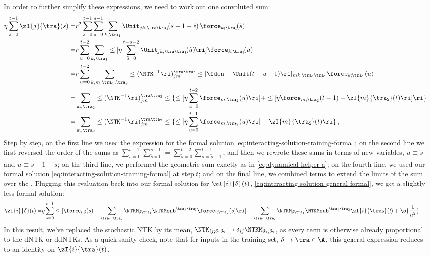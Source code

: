 In order to further simplify these expressions, we need to work out one convoluted sum:
\begin{align}
\eta\sum_{s=0}^{t-1}\zI{j}{\tra}(s)=&\eta^2\sum_{s=0}^{t-1}\sum_{\tilde{s}=0}^{s-1}\sum_{k,\tra_1} \Unit_{jk;\tra\tra_1}\!(s-1-\tilde{s})\,\force_{k;\tra_1}\!(\tilde{s})\, \\
=&\eta \sum_{u=0}^{t-2}\sum_{k,\tra_1} \le[\eta \sum_{\tilde{u}=0}^{t-u-2}\Unit_{jk;\tra\tra_1}\!(\tilde{u})\ri]\force_{k;\tra_1}\!(u)\, \notag\\
=&\eta\sum_{u=0}^{t-2}\sum_{k,m,\tra_1,\tra_2}\le(\NTK^{-1}\ri)_{jm}^{\tra\tra_2}\le[\Iden-\Unit(t-u-1)\ri]_{mk;\tra_2\tra_1}\force_{k;\tra_1}(u)\, \notag\\
=&\sum_{m,\tra_2}\le(\NTK^{-1}\ri)_{jm}^{\tra\tra_2}\le\{\le[\eta\sum_{u=0}^{t-2}\force_{m;\tra_2}(u)\ri]+ \le[ \eta\force_{m;\tra_2}(t-1) -\zI{m}{\tra_2}(t)\ri]   \ri\}\, \notag\\
=&\sum_{m,\tra_2}\le(\NTK^{-1}\ri)_{jm}^{\tra\tra_2}\le\{\le[\eta\sum_{u=0}^{t-1}\force_{m;\tra_2}(u)\ri]-\zI{m}{\tra_2}(t)\ri\}\, ,\notag
\end{align}
Step by step, on the first line we used the expression for the formal solution \eqref{eq:interacting-solution-training-formal}; on the second line we first reversed the order of the sums as $\sum_{s=0}^{t-1} \sum_{\tilde{s}=0}^{s-1} = \sum_{\tilde{s}=0}^{t-2} \sum_{s=\tilde{s}+1}^{t-1}$, and then we rewrote these sums in terms of new variables, $u\equiv \tilde{s}$ and $\tilde{u}\equiv s-1-\tilde{s}$; on the third line, we performed the geometric sum exactly as in \eqref{eq:dynamical-helper-a};
on the fourth line, we used our formal solution \eqref{eq:interacting-solution-training-formal} at step $t$; and on the final line, we combined terms to extend the limits of the sum over the . Plugging this evaluation back into our formal solution for $\zI{i}{\delta}(t)$,
\eqref{eq:interacting-solution-general-formal}, we get a slightly less formal solution:
\begin{align}\label{eq:interacting-solution-general}
\zI{i}{\delta}(t)=&\eta\sum_{s=0}^{t-1}\le[\force_{i;\delta}(s)-\sum_{\tra_1,\tra_2}\NTKM_{\delta\tra_1}\NTKMsub^{\tra_1\tra_2}\force_{i;\tra_2}(s)\ri]+\sum_{\tra_1,\tra_2}\NTKM_{\delta\tra_1}\NTKMsub^{\tra_1\tra_2}\zI{i}{\tra_2}(t) + \o{\frac{1}{n^2}}\, .
\end{align}
In this result, we've replaced the stochastic NTK by its mean, $\NTK_{ij;\delta_1\delta_2}\to\delta_{ij}\NTKM_{\delta_1,\delta_2}$, as every term is otherwise already proportional to the dNTK or ddNTKs. As a quick sanity check, note that for inputs in the training set, $\delta \to \tra \in \A$, this general expression reduces to an identity on $\zI{i}{\tra}(t)$.

